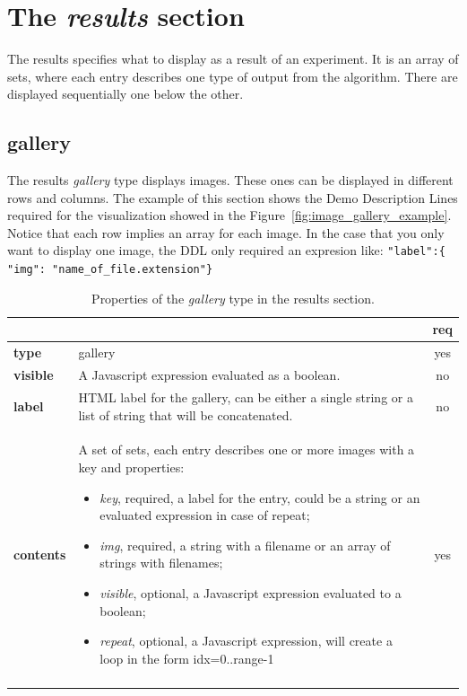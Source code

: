 \section{The \emph{results} section}

The results specifies what to display as a result of an experiment. It is an array of sets, where each entry describes one type of output from the algorithm. There are displayed sequentially one below the other.

\subsection{gallery}

The results \emph{gallery} type displays images. These ones can be displayed in different rows and columns. The example of this section shows the Demo Description Lines required for the visualization showed in the Figure~\ref{fig:image_gallery_example}. Notice that each row implies an array for each image. In the case that you only want to display one image, the DDL only required an expresion like:  \texttt{"label":\{ "img": "name\_of\_file.extension"\}}

\begin{longtable}{|>{\bf}L{\linewidth}|L{\linewidth}|c|}
\hline
      &  & {\bf req} 
\tabularnewline \hline \hline
 type       & gallery  & yes \\ \hline
 visible    & A Javascript expression evaluated as a boolean. & no \\ \hline
 label      & HTML label for the gallery, can be either a single string or 
             a list of string that will be concatenated. & no \\ \hline
 contents   & A set of sets, each entry describes one or more images with a key and properties:
\vspace{-1em}
\begin{itemize}
    \setlength\itemsep{-0.5em}
    \item \textit{key}, required, a label for the entry, could be a string or an evaluated expression in case of repeat;
    \item \textit{img}, required, a string with a filename or an array of strings with filenames;
    \item \textit{visible}, optional, a Javascript expression evaluated to a boolean;
    \item \textit{repeat}, optional, a Javascript expression, will create a loop in the form idx=0..range-1
\end{itemize} 
\vspace{-1em} & yes \\ \hline
\caption{Properties of the \emph{gallery} type in the results section.}
\end{longtable}

